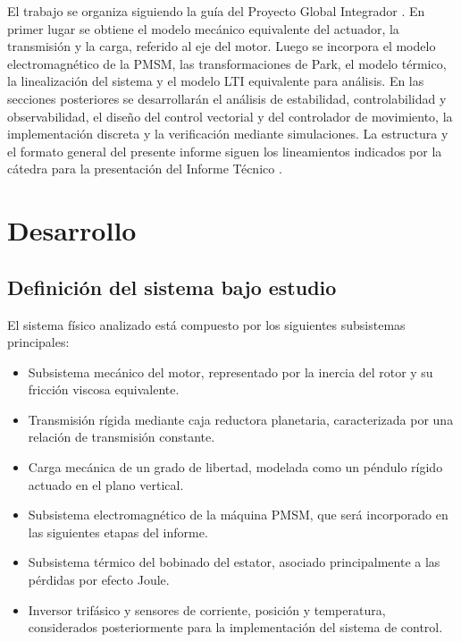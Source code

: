 \documentclass[10pt,a4paper]{article}
\begin{document}
El trabajo se organiza siguiendo la guía del Proyecto Global Integrador \cite{guia_trabajo}. En primer lugar se obtiene el modelo mecánico equivalente del actuador, la transmisión y la carga, referido al eje del motor. Luego se incorpora el modelo electromagnético de la PMSM, las transformaciones de Park, el modelo térmico, la linealización del sistema y el modelo LTI equivalente para análisis. En las secciones posteriores se desarrollarán el análisis de estabilidad, controlabilidad y observabilidad, el diseño del control vectorial y del controlador de movimiento, la implementación discreta y la verificación mediante simulaciones. La estructura y el formato general del presente informe siguen los lineamientos indicados por la cátedra para la presentación del Informe Técnico \cite{guia_informe}.

\section{Desarrollo}

\subsection{Definición del sistema bajo estudio}

El sistema físico analizado está compuesto por los siguientes subsistemas principales:

\begin{itemize}[leftmargin=*]
    \item Subsistema mecánico del motor, representado por la inercia del rotor y su fricción viscosa equivalente.
    \item Transmisión rígida mediante caja reductora planetaria, caracterizada por una relación de transmisión constante.
    \item Carga mecánica de un grado de libertad, modelada como un péndulo rígido actuado en el plano vertical.
    \item Subsistema electromagnético de la máquina PMSM, que será incorporado en las siguientes etapas del informe.
    \item Subsistema térmico del bobinado del estator, asociado principalmente a las pérdidas por efecto Joule.
    \item Inversor trifásico y sensores de corriente, posición y temperatura, considerados posteriormente para la implementación del sistema de control.
\end{itemize}
\end{document}

